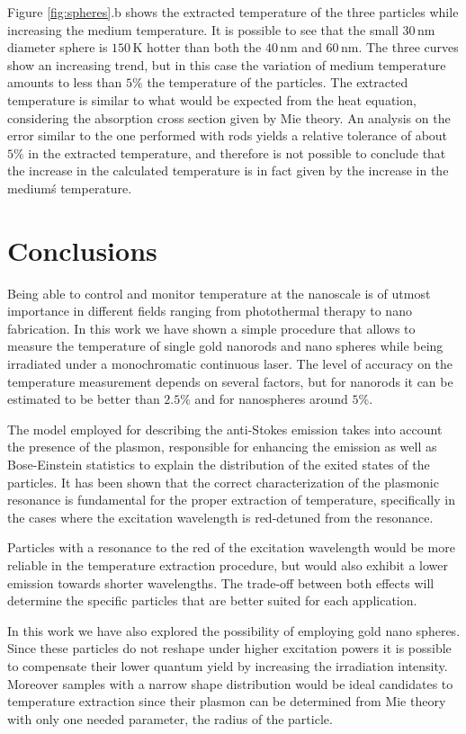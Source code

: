 \documentclass[journal=nalefd,manuscript=letter]{achemso}
\newcommand{\K}{\ensuremath{\,\textrm{K}}}
\newcommand{\nm}{\ensuremath{\,\textrm{nm}}}
\begin{document}
Figure \ref{fig:spheres}.b shows the extracted temperature of the three
particles while increasing the medium temperature. It is possible to see that
the small $30\nm$ diameter sphere is $150\K$ hotter than both the $40\nm$ and
$60\nm$. The three curves show an increasing trend, but in this case the
variation of medium temperature amounts to less than $5\%$ the temperature of
the particles. The extracted temperature is similar to what would be expected
from the heat equation, considering the absorption cross section given by Mie
theory. An analysis on the error similar to the one performed with rods yields a
relative tolerance of about $5\%$ in the extracted temperature, and therefore is
not possible to conclude that the increase in the calculated temperature is in
fact given by the increase in the medium\'s temperature.

\section{Conclusions}
Being able to control and monitor temperature at the nanoscale is of utmost
importance in different fields ranging from photothermal therapy\cite{Huang2006}
to nano fabrication\cite{Fedoruk2013}. In this work we have shown a simple
procedure that allows to measure the temperature of single gold nanorods and
nano spheres while being irradiated under a monochromatic continuous laser. The
level of accuracy on the temperature measurement depends on several factors, but
for nanorods it can be estimated to be better than $2.5\%$ and for nanospheres
around $5\%$.

The model employed for describing the anti-Stokes emission takes into account
the presence of the plasmon, responsible for enhancing the emission as well as
Bose-Einstein statistics to explain the distribution of the exited states of the
particles. It has been shown that the correct characterization of the plasmonic
resonance is fundamental for the proper extraction of temperature, specifically
in the cases where the excitation wavelength is red-detuned from the resonance.

Particles with a resonance to the red of the excitation wavelength would be more
reliable in the temperature extraction procedure, but would also exhibit a lower
emission towards shorter wavelengths. The trade-off between both effects will
determine the specific particles that are better suited for each application.

In this work we have also explored the possibility of employing gold nano
spheres. Since these particles do not reshape under higher excitation powers it
is possible to compensate their lower quantum yield by increasing the
irradiation intensity. Moreover samples with a narrow shape distribution would
be ideal candidates to temperature extraction since their plasmon can be
determined from Mie theory with only one needed parameter, the radius of the
particle.
\end{document}
